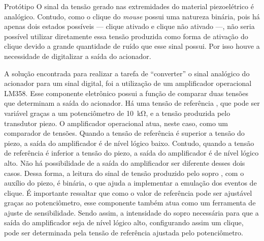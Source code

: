 \begin{chapter}{Protótipo}
O sinal da tensão gerado nas extremidades do material piezoelétrico é analógico.
Contudo, como o clique do \textit{mouse} possui uma natureza binária, pois há
apenas dois estados possíveis --- clique ativado e clique não ativado ---, não
seria possível utilizar diretamente essa tensão produzida como forma de ativação
do clique devido a grande quantidade de ruído que esse sinal possui. Por isso 
houve a necessidade de digitalizar a saída do acionador.

A solução encontrada para realizar a tarefa de ``converter'' o sinal analógico
do acionador para um sinal digital, foi a utilização de um amplificador
operacional LM358. Esse componente eletrônico possui a função de comparar duas
tensões que determinam a saída do acionador. Há uma tensão de referência
, que pode ser variável graças a um potenciômetro de 10~k\si{\ohm}, e a tensão
produzida pelo transdutor piezo. O amplificador operacional atua, neste caso,
como um comparador de tensões. Quando a tensão de referência é superior a tensão
do piezo, a saída do amplificador é de nível lógico baixo. Contudo, quando a
tensão de referência é inferior a tensão do piezo, a saída do amplificador é de
nível lógico alto. Não há possibilidade de a saída do amplificador ser diferente
desses dois casos. Dessa forma, a leitura do sinal de tensão produzido pelo sopro
, com o auxílio do piezo, é binária, o que ajuda a implementar a emulação dos
eventos de clique. É importante ressaltar que como o valor de referência 
pode ser ajustável graças ao potenciômetro, esse componente também atua como um
ferramenta de ajuste de sensibilidade. Sendo assim, a intensidade do sopro
necessária para que a saída do amplificador seja de nível lógico alto,
configurando assim um clique, pode ser determinada pela tensão de referência
ajustada pelo potenciômetro.


\end{chapter}
